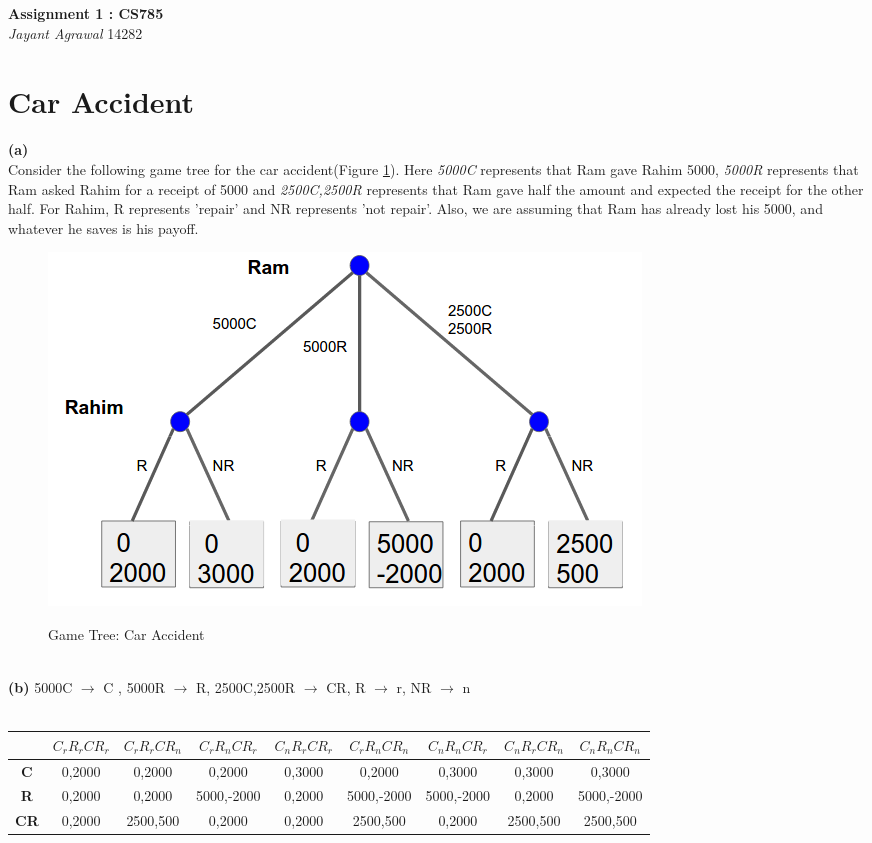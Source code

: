 \documentclass{article}
\begin{document}

\begin{center}
\textbf{\Large Assignment 1 : CS785} \\
\textit{\large Jayant Agrawal}         14282
\end{center}

\section{Car Accident}
\textbf{(a)} \\
Consider the following game tree for the car accident(Figure \ref{1_gt1}). Here \emph{5000C} represents that Ram gave Rahim 5000, \emph{5000R} represents that Ram asked Rahim for a receipt of 5000 and \emph{2500C,2500R} represents that Ram gave half the amount and expected the receipt for the other half. For Rahim, R represents 'repair' and NR represents 'not repair'. Also, we are assuming that Ram has already lost his 5000, and whatever he saves is his payoff.
\begin{figure}[h!]
\begin{center}
\includegraphics[scale=0.4]{1_gt1.png}
\label{1_gt1}
\caption{Game Tree: Car Accident}
\end{center}
\end{figure} \\
\textbf{(b)} 5000C $\rightarrow$ C , 5000R $\rightarrow$ R, 2500C,2500R $\rightarrow$ CR, R $\rightarrow$ r, NR $\rightarrow$ n\\ \\
\begin{center}
\begin{tabular}{|c|c|c|c|c|c|c|c|c|}
\hline
& $C_rR_rCR_r$ & $C_rR_rCR_n$ & $C_rR_nCR_r$ & $C_nR_rCR_r$ & $C_rR_nCR_n$ & $C_nR_nCR_r$ & $C_nR_rCR_n$ & $C_nR_nCR_n$ \\
\hline
\textbf{C} & 0,2000 & 0,2000 & 0,2000 & 0,3000 & 0,2000 & 0,3000 & 0,3000 & 0,3000 \\
\hline
\textbf{R} & 0,2000 & 0,2000 & 5000,-2000 & 0,2000 & 5000,-2000 & 5000,-2000 & 0,2000 & 5000,-2000 \\
\hline
\textbf{CR} & 0,2000 & 2500,500 & 0,2000 & 0,2000 & 2500,500 & 0,2000 & 2500,500 & 2500,500 \\
\hline
\end{tabular} 
\end{center}
\end{document}
